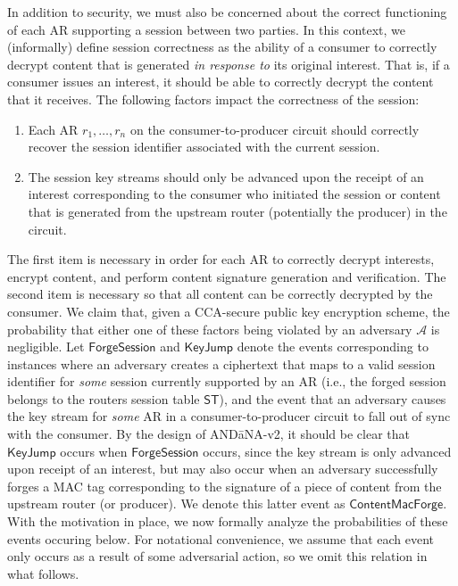 \documentclass[10pt]{article}
\begin{document}
In addition to security, we must also be concerned about the correct functioning of each AR supporting a session between two parties. In this context, we (informally) define session correctness as the ability of a consumer to correctly decrypt content that is generated \emph{in response to} its original interest. That is, if a consumer issues an interest, it should be able to correctly decrypt the content that it receives. The following factors impact the correctness of the session:
\begin{enumerate}
  \item Each AR $r_1,\dots,r_n$ on the consumer-to-producer circuit should correctly recover the session identifier associated with the current session. 
  \item The session key streams should only be advanced upon the receipt of an interest corresponding to the consumer who initiated the session or content that is generated from the upstream router (potentially the producer) in the circuit.
\end{enumerate}

The first item is necessary in order for each AR to correctly decrypt interests, encrypt content, and perform content signature generation and verification. The second item is necessary so that all content can be correctly decrypted by the consumer. We claim that, given a CCA-secure public key encryption scheme, the probability that either one of these factors being violated by an adversary $\mathcal{A}$ is negligible. Let $\mathsf{ForgeSession}$ and $\mathsf{KeyJump}$ denote the events corresponding to instances where an adversary creates a ciphertext that maps to a valid session identifier for \emph{some} session currently supported by an AR (i.e., the forged session belongs to the routers session table $\mathsf{ST}$), and the event that an adversary causes the key stream for \emph{some} AR in a consumer-to-producer circuit to fall out of sync with the consumer. By the design of {\sf AND\=aNA-v2}, it should be clear that $\mathsf{KeyJump}$ occurs when $\mathsf{ForgeSession}$ occurs, since the key stream is only advanced upon receipt of an interest, but may also occur when an adversary successfully forges a MAC tag corresponding to the signature of a piece of content from the upstream router (or producer). We denote this latter event as $\mathsf{ContentMacForge}$. With the motivation in place, we now formally analyze the probabilities of these events occuring below. For notational convenience, we assume that each event only occurs as a result of some adversarial action, so we omit this relation in what follows.
\end{document}

